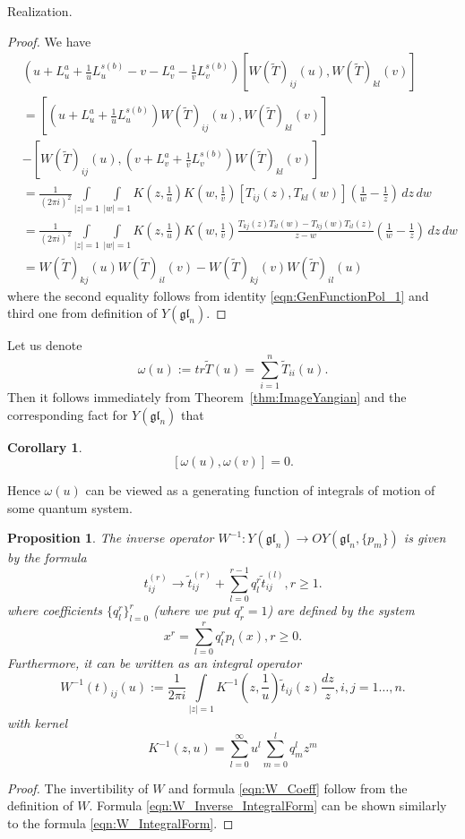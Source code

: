 \documentclass[10pt]{article}%
\numberwithin{equation}{section}
\newtheorem{cor}[thm]{Corollary}
\newtheorem{prop}[thm]{Proposition}
\newcommand{\gl}{{\mathfrak{gl}}}
\begin{document}
\begin{paragraph}{Realization.}
\begin{proof}
We have 
\begin{eqnarray}
 &\left(u+L^a_u+\frac{1}{u}L^{s(b)}_u - v-L^a_v-\frac{1}{v}L^{s(b)}_v\right) [W(\tilde{T})_{ij}(u),W(\tilde{T})_{kl}(v)]\nonumber\\
 &=[\left(u+L^a_u+\frac{1}{u}L^{s(b)}_u\right)W(\tilde{T})_{ij}(u),W(\tilde{T})_{kl}(v)]\nonumber\\
 &-[W(\tilde{T})_{ij}(u),(v+L^a_v+\frac{1}{v}L^{s(b)}_v)W(\tilde{T})_{kl}(v)]\nonumber\\
 &=\frac{1}{(2\pi i)^2} \int\limits_{|z|=1}\int\limits_{|w|=1}K(z,\frac{1}{u})K(w,\frac{1}{v})[T_{ij}(z),T_{kl}(w)](\frac{1}{w}-\frac{1}{z})\,dz\,dw\nonumber\\
 &=\frac{1}{(2\pi i)^2} \int\limits_{|z|=1}\int\limits_{|w|=1}K(z,\frac{1}{u})K(w,\frac{1}{v})\frac{T_{kj}(z)T_{il}(w)-T_{kj}(w)T_{il}(z)}{z-w}(\frac{1}{w}-\frac{1}{z})\,dz\,dw\nonumber\\
 &=W(\tilde{T})_{kj}(u)W(\tilde{T})_{il}(v)-W(\tilde{T})_{kj}(v)W(\tilde{T})_{il}(u)
\end{eqnarray}
where the second equality follows from identity \eqref{eqn:GenFunctionPol_1} and third one from definition of $Y(\gl_n)$.
\end{proof}
Let us denote 
\[
\omega(u):=tr \tilde{T}(u)=\sum\limits_{i=1}^n \tilde{T}_{ii}(u).
\]
Then it  follows immediately from Theorem~\ref{thm:ImageYangian} and the corresponding fact for $Y(\gl_n)$ that
\begin{cor}\label{cor:FirstIntegrals}
    \[
    [\omega(u),\omega(v)]=0.
    \]
\end{cor}
Hence $\omega(u)$ can be viewed as a generating function of integrals of motion of some quantum system.
\begin{prop}\label{prop:W_Inverse}
The inverse operator $W^{-1}:Y(\gl_n)\to OY(\gl_n,\{p_m\})$ is  given by the formula
\[
t_{ij}^{(r)}\to \tilde{t}_{ij}^{(r)}+\sum\limits_{l=0}^{r-1} q_l^r \tilde{t}_{ij}^{(l)},r\geq 1.
\]
where coefficients $\{q_l^r\}_{l=0}^r$ (where we put $q_r^r=1$) are defined by the system
\begin{equation}
 x^r=\sum\limits_{l=0}^r q_l^r p_l(x), r\geq 0.\label{eqn:W_Coeff}   
\end{equation}
Furthermore, it can be written as an integral operator
\begin{equation}\label{eqn:W_Inverse_IntegralForm}
W^{-1}(t)_{ij}(u):=\frac{1}{2\pi i}\int\limits_{|z|=1} K^{-1}(z,\frac{1}{u})\tilde{t}_{ij}(z)\frac{dz}{z},i,j=1\ldots,n. 
\end{equation} 
with kernel
\[
K^{-1}(z,u)=\sum\limits_{l=0}^{\infty} u^{l}\sum\limits_{m=0}^{l}q_{m}^{l}z^{m}
\]
\end{prop}
\begin{proof}
    The invertibility of $W$ and formula \eqref{eqn:W_Coeff} follow from the definition of $W$. Formula \eqref{eqn:W_Inverse_IntegralForm} can be shown similarly to the formula \eqref{eqn:W_IntegralForm}.
\end{proof}


\end{paragraph}
\end{document}
